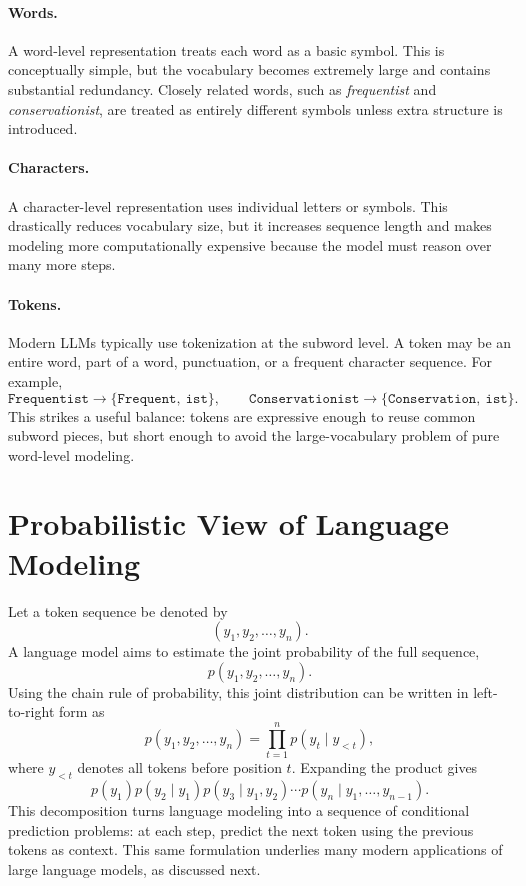 \documentclass{article}
\begin{document}
\paragraph{Words.} A word-level representation treats each word as a basic symbol. This is conceptually simple, but the vocabulary becomes extremely large and contains substantial redundancy. Closely related words, such as \emph{frequentist} and \emph{conservationist}, are treated as entirely different symbols unless extra structure is introduced.

\paragraph{Characters.} A character-level representation uses individual letters or symbols. This drastically reduces vocabulary size, but it increases sequence length and makes modeling more computationally expensive because the model must reason over many more steps.

\paragraph{Tokens.} Modern LLMs typically use tokenization at the subword level. A token may be an entire word, part of a word, punctuation, or a frequent character sequence. For example,
\[
\texttt{Frequentist} \rightarrow \{\texttt{Frequent},\ \texttt{ist}\},
\qquad
\texttt{Conservationist} \rightarrow \{\texttt{Conservation},\ \texttt{ist}\}.
\]
This strikes a useful balance: tokens are expressive enough to reuse common subword pieces, but short enough to avoid the large-vocabulary problem of pure word-level modeling.

\section{Probabilistic View of Language Modeling}
Let a token sequence be denoted by
\[
(y_1,y_2,\dots,y_n).
\]
A language model aims to estimate the joint probability of the full sequence,
\[
p(y_1,y_2,\dots,y_n).
\]
Using the chain rule of probability, this joint distribution can be written in left-to-right form as
\begin{equation}
    p(y_1,y_2,\dots,y_n)=\prod_{t=1}^{n} p(y_t\mid y_{<t}),
\end{equation}
where $y_{<t}$ denotes all tokens before position $t$. Expanding the product gives
\[
p(y_1)p(y_2\mid y_1)p(y_3\mid y_1,y_2)\cdots p(y_n\mid y_1,\dots,y_{n-1}).
\]
This decomposition turns language modeling into a sequence of conditional prediction problems: at each step, predict the next token using the previous tokens as context. This same formulation underlies many modern applications of large language models, as discussed next.
\end{document}
